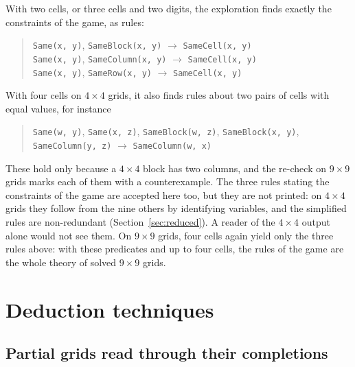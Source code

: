 \documentclass[11pt,a4paper]{article}
\theoremstyle{definition}
\theoremstyle{remark}
\begin{document}
With two cells, or three cells and two digits, the exploration finds exactly the constraints of the game, as rules:
\begin{quote}\small\raggedright
\texttt{Same(x,~y)}, \allowbreak \texttt{SameBlock(x,~y)} \;$\to$\; \texttt{SameCell(x,~y)}\\
\texttt{Same(x,~y)}, \allowbreak \texttt{SameColumn(x,~y)} \;$\to$\; \texttt{SameCell(x,~y)}\\
\texttt{Same(x,~y)}, \allowbreak \texttt{SameRow(x,~y)} \;$\to$\; \texttt{SameCell(x,~y)}
\end{quote}
With four cells on $4 \times 4$ grids, it also finds rules about two pairs of cells with equal values, for instance
\begin{quote}\small\raggedright
\texttt{Same(w,~y)}, \allowbreak \texttt{Same(x,~z)}, \allowbreak \texttt{SameBlock(w,~z)}, \allowbreak \texttt{SameBlock(x,~y)}, \allowbreak \texttt{SameColumn(y,~z)} \;$\to$\; \texttt{SameColumn(w,~x)}
\end{quote}
These hold only because a $4 \times 4$ block has two columns, and the re-check on $9 \times 9$ grids marks each of them with a counterexample. The three rules stating the constraints of the game are accepted here too, but they are not printed: on $4 \times 4$ grids they follow from the nine others by identifying variables, and the simplified rules are non-redundant (Section~\ref{sec:reduced}). A reader of the $4 \times 4$ output alone would not see them. On $9 \times 9$ grids, four cells again yield only the three rules above: with these predicates and up to four cells, the rules of the game are the whole theory of solved $9 \times 9$ grids.

\section{Deduction techniques}\label{sec:techniques}

\subsection{Partial grids read through their completions}\label{sec:reading}
\end{document}
